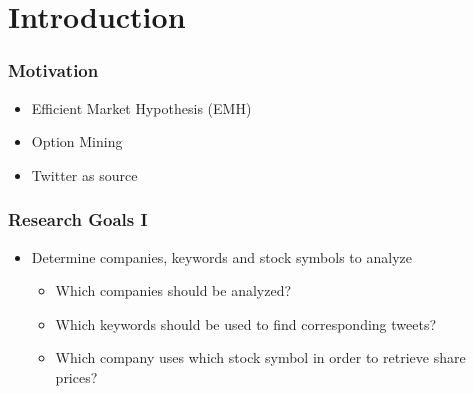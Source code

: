 
\section{Introduction}
 
\begin{frame}
    \frametitle{Motivation}
    
    \begin{itemize}
        \item Efficient Market Hypothesis (EMH)
        \item Option Mining
        \item Twitter as source
    \end{itemize}
\end{frame}

\begin{frame}
    \frametitle{Research Goals I}
    
    \begin{itemize}
        \item Determine companies, keywords and stock symbols to analyze
        
        \begin{itemize}
            \item Which companies should be analyzed?
            \item Which keywords should be used to find corresponding tweets?
            \item Which company uses which stock symbol in order to retrieve share prices?
        \end{itemize}

    \end{itemize}
\end{frame}

